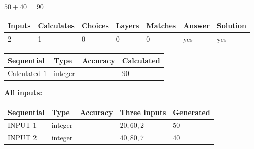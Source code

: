 \documentclass[12pt]{article}
\begin{document}
 
\noindent{}
 
 

 
 
 
\noindent{}
 
 

$ %
50 +  %
40=   %
90$
 
 
\noindent{}
 
 

 
   
   
   
   
\noindent\begin{tabular}{|l|l|l|l|l|l|l|}
 \hline
Inputs & Calculates & Choices & Layers & Matches & Answer & Solution \\ \hline
 2  & 
 1  & 
 0
  & 
 0  & 
 0  & 
  yes & 
  yes 
  \\ \hline
 \end{tabular}
   
   
   
   
\noindent{}
   
   
  
  
\noindent\begin{tabular}{|l|l|l|l|}
\hline
 Sequential & Type & Accuracy & Calculated \\ 
\hline
 
 
  Calculated $  1 $ & integer &  & 
  $ 90 $ 
 \\  \hline  
 \end{tabular}
   
   
   
   
\noindent\vspace{0.1in}\hspace{-0.08in} {\textbf{\Large{All inputs: }}}
   
   
  
  
\noindent\begin{tabular}{|l|l|l|l|l|}
\hline
 Sequential & Type & Accuracy & Three inputs & Generated \\ 
\hline
 
 
  INPUT $  1 $ & integer &  & $
 20
 , 
 60
 , 
 2
 $ & $ 50 $ 
 \\  \hline  
 
 
  INPUT $  2 $ & integer &  & $
 40
 , 
 80
 , 
 7
 $ & $ 40 $ 
 \\  \hline  
 \end{tabular}
   
\end{document}
